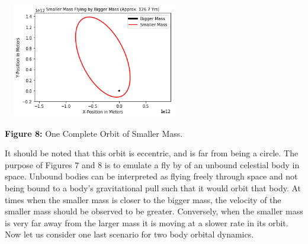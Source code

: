 \documentclass[]{article}
\begin{document}
\begin{multicols}{2}
\begin{center}
\includegraphics[width=8cm, height=5.0cm]{PHYS 342 FP 2-Body Fly By (2).png}
\caption{\small{\textbf{Figure 8:}} \tiny{One Complete Orbit of Smaller Mass.}}
\end{center}
It should be noted that this orbit is eccentric, and is far from being a circle. The purpose of Figures 7 and 8 is to emulate a fly by of an unbound celestial body in space. Unbound bodies can be interpreted as flying freely through space and not being bound to a body's gravitational pull such that it would orbit that body. At times when the smaller mass is closer to the bigger mass, the velocity of the smaller mass should be observed to be greater. Conversely, when the smaller mass is very far away from the larger mass it is moving at a slower rate in its orbit. Now let us consider one last scenario for two body orbital dynamics. 
\par

\end{multicols}
\end{document}
